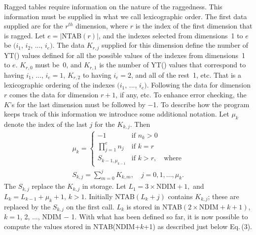 \documentclass[twoside]{MATH77}
\begin{document}
Ragged tables require information on the nature of the raggedness. This
information must be supplied in what we call lexicographic order. The first
data supplied are for the $r^{th}$ dimension, where $r$ is the index of the
first dimension that is ragged. Let $e=|$NTAB$(r)|$, and the indexes
selected from dimensions~1 to $e$ be $(i_1$, $i_2$, ..., $i_e)$. The data $%
K_{r,j}$ supplied for this dimension define the number of YT() values defined
for all the possible values of the indexes from dimensions~1 to $e$. $K_{r,0}
$ must be~0, and $K_{r,1}$ is the number of YT() values that correspond to
having $i_1$, ..., $i_e =1$, $K_{r,2}$ to having $i_e=2$, and all of the
rest~1, etc. That is a lexicographic ordering of the indexes $(i_1$, ..., $%
i_e)$. Following the data for dimension $r$ comes the data for dimension $r+1
$, if any, etc. To enhance error checking, the $K$'s for the last
dimension must be followed by $-$1. To describe how the program keeps
track of this information we introduce some additional notation. Let $\mu _k$
denote the index of the last $j$ for the $K_{k,j}$. Then
\begin{gather}\label{O4}
\mu _k=
\begin{cases}
-1 & \text{if }n_k>0\\
\prod_{j=1}^en_j & \text{if }k=r\\
S_{k-1,\mu _{k-1}} & \text{if }k>r,\quad \text{where}
\end{cases}\\
\label{O5}
S_{k,j}=\sum_{m=0}^jK_{k,m},\quad j=0,1,...,\mu _k.
\end{gather}
The $S_{k,j}$ replace the $K_{k,j}$ in storage. Let $L_1=3\times
\text{NDIM} + 1,$ and $L_k=L_{k-1}+\mu _k+1$, $k>1$. Initially NTAB$(L_k+j)$
contains $K_{k,j}$; these are replaced by the $S_{k,j}$ on the first call. $%
L_k$ is stored in NTAB$(2\times \text{NDIM}+k+1)$, $k=1$, 2, ..., NDIM
$-$ 1. With what has been defined so far, it is now possible to compute
the values stored in NTAB(NDIM+$k$+1) as described just below Eq.\,(3).
\end{document}
